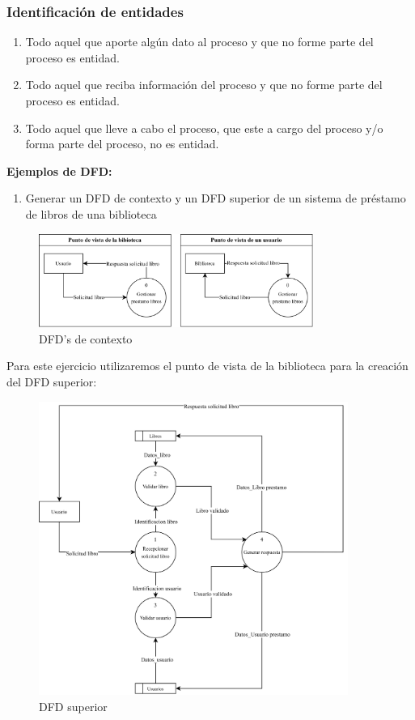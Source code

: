 \documentclass{templateNote}
\begin{document}
\subsubsection{Identificación de entidades}
\begin{enumerate}
    \item Todo aquel que aporte algún dato al proceso y que no forme parte del proceso es entidad.
    \item Todo aquel que reciba información del proceso y que no forme parte del proceso es entidad.
    \item Todo aquel que lleve a cabo el proceso, que este a cargo del proceso y/o forma parte del proceso, no es entidad.
\end{enumerate}
\newpage
\textbf{Ejemplos de DFD:}
\begin{enumerate}
    \item Generar un DFD de contexto y un DFD superior de un sistema de préstamo de libros de una biblioteca
\end{enumerate}
\begin{figure}[H]
    \centering
    \includegraphics[width=0.8\textwidth]{img/dfdcontexto1.png}
    \caption{DFD's de contexto}
\end{figure}
Para este ejercicio utilizaremos el punto de vista de la biblioteca para la creación del DFD superior:
\begin{figure}[H]
    \centering
    \includegraphics[width=0.9\textwidth]{img/dfdsuperior1.png}
    \caption{DFD superior}
\end{figure}
\end{document}
